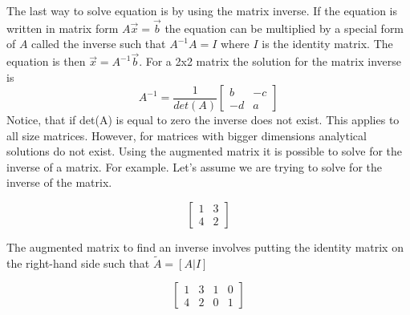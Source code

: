 \begin{enumerate}
The last way to solve equation is by using the matrix inverse. If the
equation is written in matrix form $A\vec{x} = \vec{b}$ the equation
can be multiplied by a special form of $A$ called the inverse such
that $A^{-1}A = I$ where $I$ is the identity matrix. The equation is
then $\vec{x} = A^{-1}\vec{b}$. For a 2x2 matrix the solution for the
matrix inverse is 
\begin{equation}
A^{-1} = \frac{1}{det(A)}\begin{bmatrix}b & -c \\ -d & a \end{bmatrix}
\end{equation}
Notice, that if det(A) is equal to zero the inverse does not
exist. This applies to all size matrices. However, for matrices with
bigger dimensions analytical solutions do not exist. Using the
augmented matrix it is possible to solve for the  
inverse of a matrix. For example. Let's assume we are trying to solve
for the inverse of the matrix.

\begin{equation}
\begin{bmatrix}
1 & 3  \\
4 & 2
\end{bmatrix}
\end{equation}

The augmented matrix to find an inverse involves putting the identity
matrix on the right-hand side such that $\tilde{A}=[A|I]$

\begin{equation}
\begin{bmatrix}
1 & 3 & 1 & 0\\
4 & 2 & 0 & 1
\end{bmatrix}
\end{equation}


\end{enumerate}
